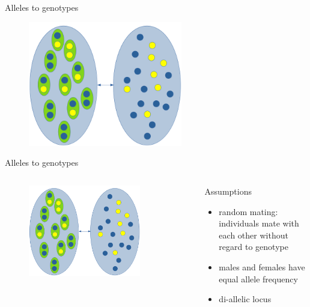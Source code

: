 \begin{frame}{Alleles to genotypes}

	\begin{figure}
        	\includegraphics[width=0.6\textwidth]{Pics/alleles2geno}
        \end{figure}

\end{frame}


\begin{frame}{Alleles to genotypes}

        \begin{columns}


                \begin{figure}
                        \includegraphics[width=0.8\textwidth]{Pics/alleles2geno}
                \end{figure}


                \small
                \begin{block}{Assumptions}
			\begin{itemize}
				\item random mating: individuals mate with each other without regard to genotype
				\item males and females have equal allele frequency
				\item di-allelic locus
			\end{itemize}
                \end{block}

        \end{columns}

\end{frame}


